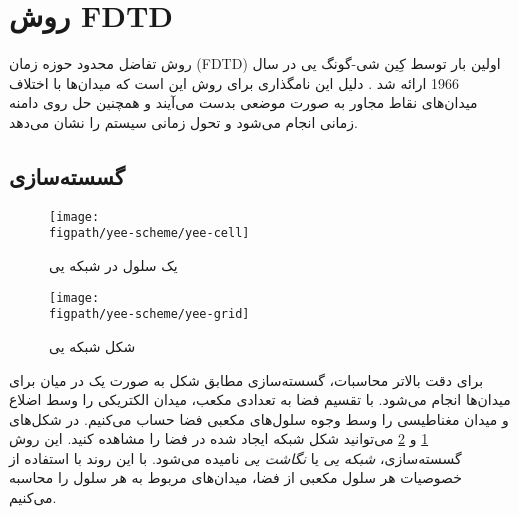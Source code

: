 \documentclass[12pt,a4paper]{article}
\newcommand{\figpath}{../figures}
\begin{document}
	\section{روش FDTD}
	روش تفاضل محدود حوزه زمان (FDTD) اولین بار توسط کِین شی-گونگ یی در سال 1966 ارائه شد .
	دلیل این نامگذاری برای روش این است که میدان‌ها با اختلاف میدان‌های نقاط مجاور به صورت موضعی بدست می‌آیند و همچنین حل
	روی دامنه زمانی انجام می‌شود و تحول زمانی سیستم را نشان می‌دهد.
	\subsection{گسسته‌سازی}
	\begin{figure}
		\centering
		\texttt{[image: \\figpath/yee-scheme/yee-cell]}
		\caption{یک سلول در شبکه یی}
		\label{yeecell}
	\end{figure}
	\begin{figure}
		\centering
		\texttt{[image: \\figpath/yee-scheme/yee-grid]}
		\caption{شکل شبکه یی}
		\label{yeegrid}
	\end{figure}
	برای دقت بالاتر محاسبات، گسسته‌سازی مطابق شکل به صورت یک در میان برای میدان‌ها انجام می‌شود.
	با تقسیم فضا به تعدادی مکعب، میدان الکتریکی را وسط اضلاع و میدان مغناطیسی را وسط وجوه سلول‌های مکعبی فضا حساب می‌کنیم.
	در شکل‌های \ref{yeecell} و \ref{yeegrid} می‌توانید شکل شبکه ایجاد شده در فضا را مشاهده کنید.
	این روش گسسته‌سازی، \emph{شبکه یی} یا \emph{نگاشت یی} نامیده می‌شود.
	با این روند با استفاده از خصوصیات هر سلول مکعبی از فضا، میدان‌های مربوط به هر سلول را محاسبه می‌کنیم.
	
\end{document}
